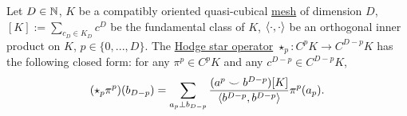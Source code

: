 \begin{proposition}
  Let
    $D \in \mathbb{N}$,
    $K$ be a compatibly oriented quasi-cubical
    \hyperref[cmc:mesh:definition]{mesh} of dimension $D$,
    $[K] := \sum_{c_D \in K_D} c^D$ be the fundamental class of $K$,
    $\langle\cdot,\cdot\rangle$ be an orthogonal inner product on $K$,
    $p \in \{0, ..., D\}$.
  The \hyperref[cmc/mesh/quasi_cubical/hodge_star/concept-definition]
               {Hodge star operator}
  $\star_p \colon C^p K \to C^{D - p} K$ has the following closed form:
  for any $\pi^p \in C^p K$ and any $c^{D - p} \in C^{D - p} K$,
  \begin{equation}
    (\star_p \pi^p)(b_{D - p})
    = \sum_{a_p \perp b_{D - p}}
      \frac{(a^p \smile b^{D - p})[K]}{\langle b^{D - p},b^{D - p}\rangle} \pi^p(a_p).
  \end{equation}
\end{proposition}
